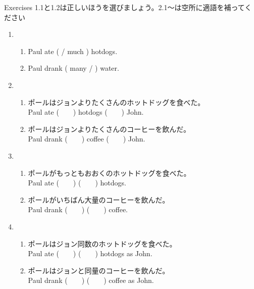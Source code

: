 \documentclass[aspectratio=169,xcolor={dvipsnames,table}]{beamer}
\begin{document}
\begin{frame}[plain]{Exercises}
1.1と1.2は正しいほうを選びましょう。2.1～は空所に適語を補ってください%
\hfill{\scriptsize {}}
 \begin{enumerate}
  \item \begin{enumerate}
	 \item<1-> Paul ate (  / much ) hotdogs.
	 \item<1-> Paul drank ( many / ) water.
	\end{enumerate}
  \item \begin{enumerate}
	 \item<1-> ポールはジョンよりたくさんのホットドッグを食べた。\\
	       Paul ate (~~~~) hotdogs (~~~~) John.
	 \item<1-> ポールはジョンよりたくさんのコーヒーを飲んだ。\\
	       Paul drank (~~~~) coffee (~~~~) John.
	\end{enumerate}
  \item \begin{enumerate}
	 \item<1-> ポールがもっともおおくのホットドッグを食べた。\\
	       Paul ate (~~~~) (~~~~) hotdogs.
	 \item<1-> ポールがいちばん大量のコーヒーを飲んだ。\\
	       Paul drank (~~~~) (~~~~) coffee.
	\end{enumerate}
  \item \begin{enumerate}
	 \item<1-> ポールはジョン同数のホットドッグを食べた。\\
	       Paul ate (~~~~) (~~~~) hotdogs as John.
	 \item<1-> ポールはジョンと同量のコーヒーを飲んだ。\\
	       Paul drank (~~~~) (~~~~) coffee as John.
	\end{enumerate}
 \end{enumerate}
\end{frame}
\end{document}
